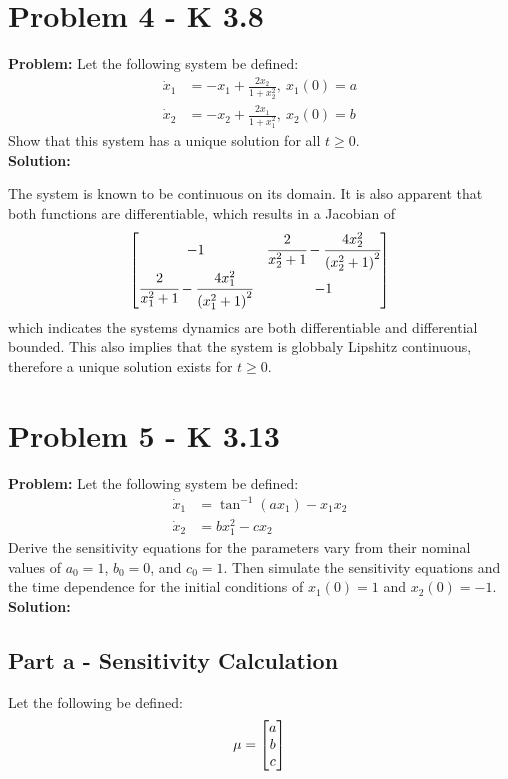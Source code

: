 \documentclass[letter]{article}
\begin{document}
\newpage
\section{Problem 4 - K 3.8}
\textbf{Problem:}
Let the following system be defined:
\begin{equation}
	\begin{aligned}
		\dot{x}_1 &= -x_1 + \frac{2 x_2}{1 + x_2^2}, \ x_1(0) = a\\
		\dot{x}_2 &= -x_2 + \frac{2 x_1}{1 + x_1^2}, \ x_2(0) = b
	\end{aligned}
\end{equation}
Show that this system has a unique solution for all $t \geq 0$.\\

\noindent
\textbf{Solution:}

The system is known to be continuous on its domain. It is also apparent that both functions are differentiable, which results in a Jacobian of
\begin{equation}
	\mqty[-1		& \cfrac{2}{x_2^2 + 1} - \cfrac{4 x_2^2}{\qty(x_2^2 + 1)^2}\\
		  \cfrac{2}{x_1^2 + 1} - \cfrac{4 x_1^2}{\qty(x_1^2 + 1)^2} & -1]
\end{equation}
which indicates the systems dynamics are both differentiable and differential bounded. This also implies that the system is globbaly Lipshitz continuous, therefore a unique solution exists for $t\geq 0$.

\newpage
\section{Problem 5 - K 3.13}
\textbf{Problem:}
Let the following system be defined:
\begin{equation}
	\begin{aligned}
		\dot{x}_1 &= \tan^{-1}(ax_1) - x_1 x_2\\
		\dot{x}_2 &= b x_1^2 - c x_2
	\end{aligned}
\end{equation}
Derive the sensitivity equations for the parameters vary from their nominal values of $a_0 = 1$, $b_0 = 0$, and $c_0 = 1$. Then simulate the sensitivity equations and the time dependence for the initial conditions of $x_1(0) = 1$ and $x_2(0) = -1$.\\

\noindent
\textbf{Solution:}
\subsection{Part a - Sensitivity Calculation}
Let the following be defined: $$\mu = \mqty[a \\ b \\ c]$$
\end{document}

